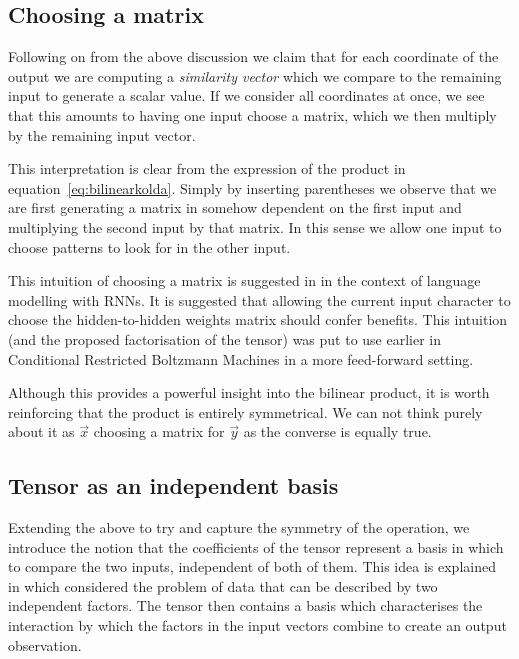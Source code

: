 \subsection{Choosing a matrix}
Following on from the above discussion we claim that for each coordinate of the output we are
computing a \emph{similarity vector} which we compare to the remaining input to generate a
scalar value. If we consider all coordinates at once, we see that this amounts to having
one input choose a matrix, which we then multiply by the remaining input vector. 

This interpretation is clear from the expression of the product in
equation~\eqref{eq:bilinearkolda}. Simply by inserting parentheses we observe that we are
first generating a matrix in somehow dependent on the first input and multiplying
the second input by that matrix. In this sense we allow one input to choose patterns to look for
in the other input.

This intuition of choosing a matrix is suggested in \autocite{Sutskever2013} in the
context of language modelling with RNNs. It is suggested that allowing the current input
character to choose the hidden-to-hidden weights matrix should confer benefits. 
This intuition (and the proposed factorisation of the tensor) was put to use earlier in
Conditional Restricted Boltzmann Machines \autocite{Taylor}in a more feed-forward setting.

Although this provides a powerful insight into the bilinear product, it is worth reinforcing that
the product is entirely symmetrical. We can not think purely about it as \(\vec{x}\) choosing a matrix
for \(\vec{y}\) as the converse is equally true.

\subsection{Tensor as an independent basis}
Extending the above to try and capture the symmetry of the operation, we introduce
the notion that the coefficients of the tensor represent a basis in which to compare the
two inputs, independent of both of them. This idea is explained in
 \autocite{Tenenbaum2000} which considered the problem of data that can be described by two
independent factors.
The tensor then contains a basis which characterises the interaction by which the factors
in the input vectors combine to create an output observation.

